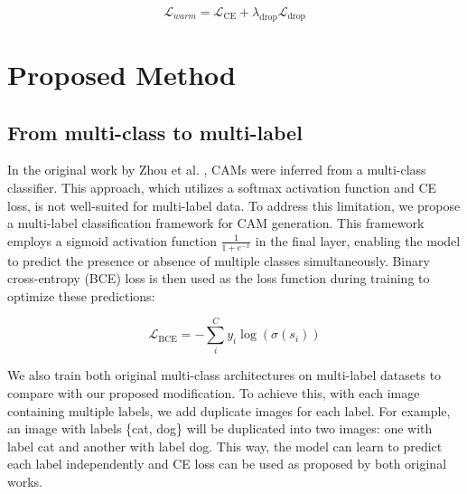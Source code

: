 \documentclass[conference]{IEEEtran}
\begin{document}
\begin{equation}
    \mathcal{L}_{warm} = \mathcal{L}_{\text{CE}} + \lambda_{\text{drop}}\mathcal{L}_{\text{drop}}
\end{equation}






\section{Proposed Method}
\subsection{From multi-class to multi-label}
In the original work by Zhou et al. \cite{zhou2015cnnlocalization}, CAMs were inferred from a multi-class classifier. This approach, which utilizes a softmax activation function and CE loss, is not well-suited for multi-label data. To address this limitation, we propose a multi-label classification framework for CAM generation. This framework employs a sigmoid activation function $\frac{1}{1 + e^{-x}}$ in the final layer, enabling the model to predict the presence or absence of multiple classes simultaneously. Binary cross-entropy (BCE) loss is then used as the loss function during training to optimize these predictions:

\begin{equation}
    \mathcal{L}_{\text{BCE}} = -\sum_{i}^{C}{y_i \log(\sigma(s_i))}
\end{equation}

We also train both original multi-class architectures \cite{zhou2015cnnlocalization} \cite{kim2022bridging} on multi-label datasets to compare with our proposed modification. To achieve this, with each image containing multiple labels, we add duplicate images for each label. For example, an image with labels \{cat, dog\} will be duplicated into two images: one with label cat and another with label dog. This way, the model can learn to predict each label independently and CE loss can be used as proposed by both original works.
\end{document}
